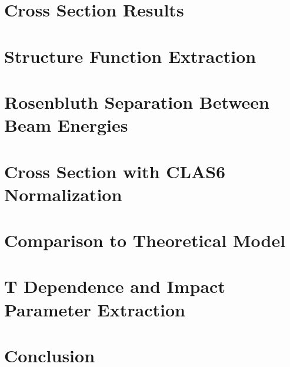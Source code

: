 \section{Cross Section Results}
    

\section{Structure Function Extraction}
    
    
\section{Rosenbluth Separation Between Beam Energies}
    
    
\section{Cross Section with CLAS6 Normalization}
    

\section{Comparison to Theoretical Model}
    
    
\section{T Dependence and Impact Parameter Extraction}
    

\section{Conclusion}
    











